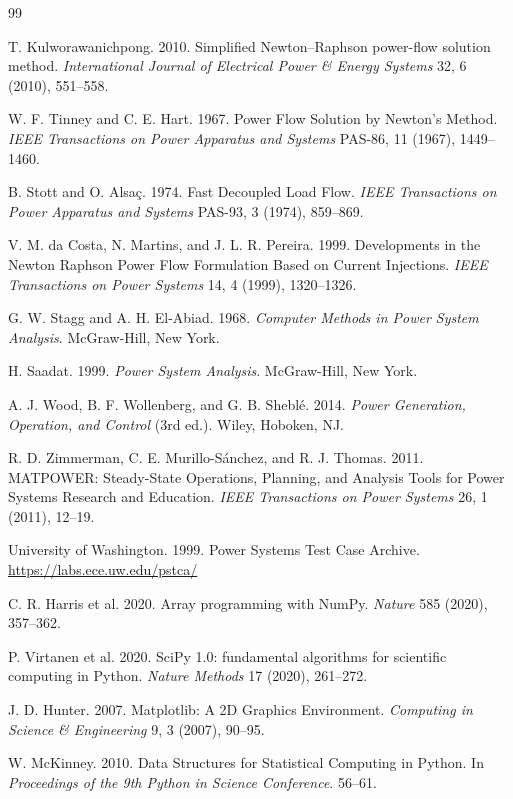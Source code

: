 \documentclass[sigconf,nonacm]{acmart}
\begin{document}
\begin{thebibliography}{99}

T. Kulworawanichpong. 2010.
Simplified Newton--Raphson power-flow solution method.
\emph{International Journal of Electrical Power \& Energy Systems} 32, 6 (2010),
551--558.

W. F. Tinney and C. E. Hart. 1967.
Power Flow Solution by Newton's Method.
\emph{IEEE Transactions on Power Apparatus and Systems} PAS-86, 11 (1967),
1449--1460.

B. Stott and O. Alsa\c{c}. 1974.
Fast Decoupled Load Flow.
\emph{IEEE Transactions on Power Apparatus and Systems} PAS-93, 3 (1974),
859--869.

V. M. da Costa, N. Martins, and J. L. R. Pereira. 1999.
Developments in the Newton Raphson Power Flow Formulation Based on Current
Injections.
\emph{IEEE Transactions on Power Systems} 14, 4 (1999), 1320--1326.

G. W. Stagg and A. H. El-Abiad. 1968.
\emph{Computer Methods in Power System Analysis}. McGraw-Hill, New York.

H. Saadat. 1999.
\emph{Power System Analysis}. McGraw-Hill, New York.

A. J. Wood, B. F. Wollenberg, and G. B. Shebl\'e. 2014.
\emph{Power Generation, Operation, and Control} (3rd ed.). Wiley, Hoboken, NJ.

R. D. Zimmerman, C. E. Murillo-S\'anchez, and R. J. Thomas. 2011.
MATPOWER: Steady-State Operations, Planning, and Analysis Tools for Power
Systems Research and Education.
\emph{IEEE Transactions on Power Systems} 26, 1 (2011), 12--19.

University of Washington. 1999.
Power Systems Test Case Archive.
\url{https://labs.ece.uw.edu/pstca/}

C. R. Harris et al. 2020.
Array programming with NumPy.
\emph{Nature} 585 (2020), 357--362.

P. Virtanen et al. 2020.
SciPy 1.0: fundamental algorithms for scientific computing in Python.
\emph{Nature Methods} 17 (2020), 261--272.

J. D. Hunter. 2007.
Matplotlib: A 2D Graphics Environment.
\emph{Computing in Science \& Engineering} 9, 3 (2007), 90--95.

W. McKinney. 2010.
Data Structures for Statistical Computing in Python.
In \emph{Proceedings of the 9th Python in Science Conference}. 56--61.

\end{thebibliography}
\end{document}
